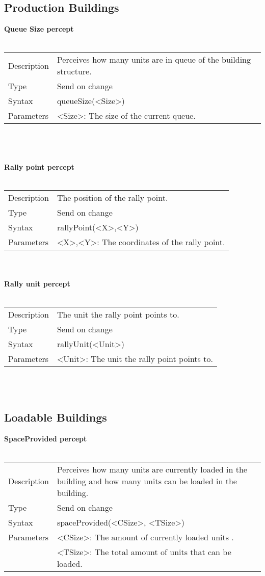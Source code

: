 \documentclass[english,11pt]{report}
\begin{document}
\subsection{Production Buildings}
\textbf{Queue Size percept}\\
\\
\begin{tabularx}{\textwidth}{lX}
 Description & Perceives how many units are in queue of the building structure.\\
 Type & Send on change \\
 Syntax & queueSize(<Size>) \\
 Parameters &   <Size>: The size of the current queue.
\end{tabularx}\\
\\
\\
\noindent
\textbf{Rally point percept}\\
\\
\begin{tabularx}{\textwidth}{lX}
 Description & The position of the rally point. \\
 Type & Send on change \\
 Syntax & rallyPoint(<X>,<Y>) \\
 Parameters &   <X>,<Y>: The coordinates of the rally point.
\end{tabularx}\\
\\
\newpage
\noindent
\textbf{Rally unit percept}\\
\\
\begin{tabularx}{\textwidth}{lX}
 Description & The unit the rally point points to. \\
 Type & Send on change \\
 Syntax & rallyUnit(<Unit>) \\
 Parameters &   <Unit>: The unit the rally point points to.
\end{tabularx}\\
\\
\subsection{Loadable Buildings}
\textbf{SpaceProvided percept}\\
\\
\begin{tabularx}{\textwidth}{lX}
 Description & Perceives how many units are currently loaded in the building and how many units can be loaded in the building. \\
 Type & Send on change \\
 Syntax & spaceProvided(<CSize>, <TSize>) \\
 Parameters &   <CSize>: The amount of currently loaded units .\\
            &   <TSize>: The total amount of units that can be loaded.
\end{tabularx}\\
\end{document}
